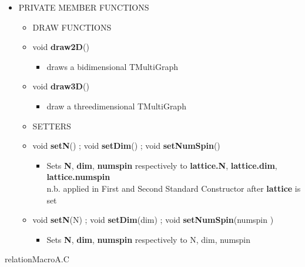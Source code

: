 \begin{itemize}
	\item[] PRIVATE MEMBER FUNCTIONS \\ 
	\begin{itemize}
			
		\item[] DRAW FUNCTIONS
			\item[] void \textbf{draw2D}()		 
			\begin{itemize}
				\item[] draws a bidimensional TMultiGraph
			\end{itemize}
			
			\item[] void \textbf{draw3D}()  		 
			\begin{itemize}
				\item[] draw a threedimensional TMultiGraph
			\end{itemize}
			
		\item[] SETTERS
			
			\item[] void \textbf{setN}() ; void \textbf{setDim}() ; void \textbf{setNumSpin}()				
			\begin{itemize}
				\item[]
						{\small
						 Sets \textbf{N}, \textbf{dim}, \textbf{num\textunderscore spin} respectively to 
						\textbf{lattice.N}, \textbf{lattice.dim}, \textbf{lattice.num\textunderscore spin} 
						\\
						\textsf{n.b.}
						applied in First and Second Standard Constructor after \textbf{lattice} is set 
						}
			\end{itemize}
			
			\item[] void \textbf{setN}(\textunderscore N) ;
					void \textbf{setDim}(\textunderscore dim) ;
					void \textbf{setNumSpin}(\textunderscore num\textunderscore spin ) 	
			\begin{itemize}
				\item[] Sets \textbf{N}, \textbf{dim}, \textbf{num\textunderscore spin} respectively to 
						\textunderscore N, \textunderscore dim, \textunderscore num\textunderscore spin
			\end{itemize}	
				
	\end{itemize}

	
\end{itemize}

\newpage


{relationMacroA.C}

